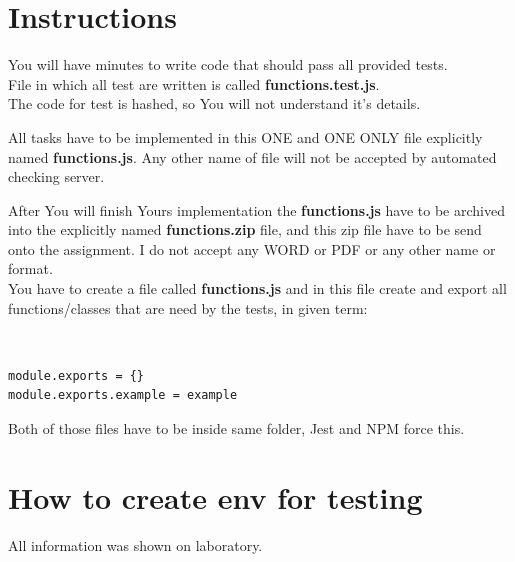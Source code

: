   \section*{Instructions}
You will have \textbf{\testDuration} minutes to write code that should pass all provided tests. \\
File in which all test are written is called \textbf{functions.test.js}.\\
The code for test is hashed, so You will not understand it’s details.\\

\begin{large}
	
	All tasks have to be implemented in this ONE and ONE ONLY file
	explicitly named \textbf{functions.js}. Any other name of file will
	not be accepted by automated checking server.
	
	After You will finish Yours implementation the
	\textbf{functions.js} have to be archived into the explicitly named
	\textbf{functions.zip} file, and this zip file have to be send onto
	the assignment.
	I do not accept any WORD or PDF or any other name or format.\\
	You have to create a file called \textbf{functions.js} and in this
	file create and export all functions/classes that are need by the
	tests, in given term:
\end{large}
\\
\begin{verbatim}
module.exports = {}
module.exports.example = example
\end{verbatim}
Both of those files have to be inside same folder, Jest and NPM force this.\\

\section*{How to create env for testing}
All information was shown on laboratory.

